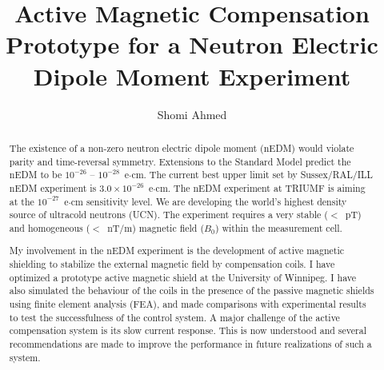 \title{Active Magnetic Compensation Prototype for a Neutron Electric Dipole Moment Experiment}
\author{Shomi Ahmed}

%
%
%





\maketitle


\begin{abstract}
The existence of a non-zero neutron electric dipole moment (nEDM) would violate parity and time-reversal symmetry.  Extensions to the Standard Model predict the nEDM to be $10^{-26}$ -- $10^{-28}$~e$\cdot$cm.  The current best upper limit set by Sussex/RAL/ILL nEDM experiment is $3.0 \times 10^{-26}$~e$\cdot$cm\cite{bestLim_1,bestLim_2}.  The nEDM experiment at TRIUMF is aiming at the $10^{-27}$~e$\cdot$cm sensitivity level.  We are developing the world's highest density source of ultracold neutrons (UCN).  The experiment requires a very stable ($<$~pT) and homogeneous ($<$~nT/m) magnetic field ($B_0$) within the measurement cell.  

My involvement in the nEDM experiment is the development of active magnetic shielding to stabilize the external magnetic field by compensation coils. I have optimized a prototype active magnetic shield at the University of Winnipeg. I have also simulated the behaviour of the coils in the presence of the passive magnetic shields  using finite element analysis (FEA), and made comparisons with  experimental results  to test the successfulness of the control system. A major challenge of the active 
compensation system is its  slow current response.  This is now understood and several recommendations are made to improve the performance in future realizations of such a system.





\end{abstract}

